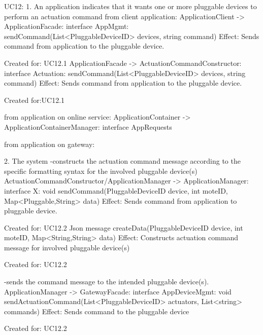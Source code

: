         UC12:
            1. An application indicates that it wants one or more pluggable devices to perform an actuation command
                from client application:
                    ApplicationClient -> ApplicationFacade:           interface AppMgmt:   sendCommand(List<PluggableDeviceID> devices, string command)
                        Effect: Sends command from application to the pluggable device.
                        \item Created for: UC12.1
                    ApplicationFacade -> ActuationCommandConstructor: interface Actuation: sendCommand(List<PluggableDeviceID> devices, string command)
                        Effect: Sends command from application to the pluggable device.
                        \item Created for:UC12.1

                from application on online service:
                    ApplicationContainer -> ApplicationContainerManager: interface AppRequests

                from application on gateway:

            2. The system
                -constructs the actuation command message according to the specific formatting syntax for the involved pluggable device(s)
                    ActuationCommandConstructor/ApplicationManager -> ApplicationManager: interface X:
                      void sendCommand(PluggableDeviceID device, int moteID, Map<Pluggable,String> data)
                        Effect: Sends command from application to pluggable device.
                        \item Created for: UC12.2
                    Json message createData(PluggableDeviceID device, int moteID, Map<String,String> data)
                        Effect: Constructs actuation command message for involved pluggable device(s)
                        \item Created for: UC12.2
                   

                -sends the command message to the intended pluggable device(s).
                    ApplicationManager -> GatewayFacade: interface AppDeviceMgmt:
                                          void sendActuationCommand(List<PluggableDeviceID> actuators, List<string> commands)
                         Effect: Sends command to the pluggable device
                        \item Created for: UC12.2
                   


